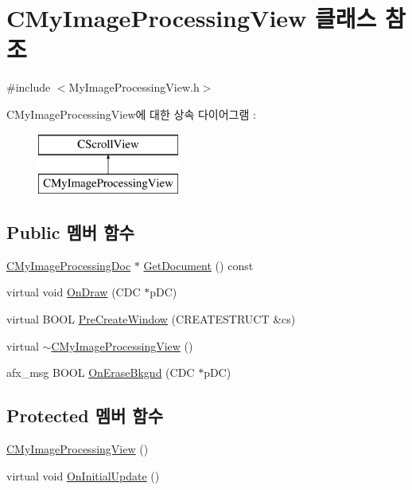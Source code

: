 \hypertarget{class_c_my_image_processing_view}{\section{C\-My\-Image\-Processing\-View 클래스 참조}
\label{class_c_my_image_processing_view}
}


{\ttfamily \#include $<$My\-Image\-Processing\-View.\-h$>$}

C\-My\-Image\-Processing\-View에 대한 상속 다이어그램 \-: \begin{figure}[H]
\begin{center}
\leavevmode
\includegraphics[height=2.000000cm]{class_c_my_image_processing_view}
\end{center}
\end{figure}
\subsection*{Public 멤버 함수}
\begin{DoxyCompactItemize}
\item 
\hyperlink{class_c_my_image_processing_doc}{C\-My\-Image\-Processing\-Doc} $\ast$ \hyperlink{class_c_my_image_processing_view_ae19eb5b26c93701a159e2ba4f8450642}{Get\-Document} () const 
\item 
virtual void \hyperlink{class_c_my_image_processing_view_a8141402da8677e04e9e50643e01cf0dc}{On\-Draw} (C\-D\-C $\ast$p\-D\-C)
\item 
virtual B\-O\-O\-L \hyperlink{class_c_my_image_processing_view_a6fc6c61da49421369f2705b5db7a3008}{Pre\-Create\-Window} (C\-R\-E\-A\-T\-E\-S\-T\-R\-U\-C\-T \&cs)
\item 
virtual \hyperlink{class_c_my_image_processing_view_a62b5e3b81a2aa694615f507e4100c75e}{$\sim$\-C\-My\-Image\-Processing\-View} ()
\item 
afx\-\_\-msg B\-O\-O\-L \hyperlink{class_c_my_image_processing_view_affb65d870bf1d6cd682178ecf64ccab3}{On\-Erase\-Bkgnd} (C\-D\-C $\ast$p\-D\-C)
\end{DoxyCompactItemize}
\subsection*{Protected 멤버 함수}
\begin{DoxyCompactItemize}
\item 
\hyperlink{class_c_my_image_processing_view_a0ccc747475b76eb445e997c6dd5d4496}{C\-My\-Image\-Processing\-View} ()
\item 
virtual void \hyperlink{class_c_my_image_processing_view_aea4e6524b1eb6e73f1f444c1984323af}{On\-Initial\-Update} ()
\end{DoxyCompactItemize}


